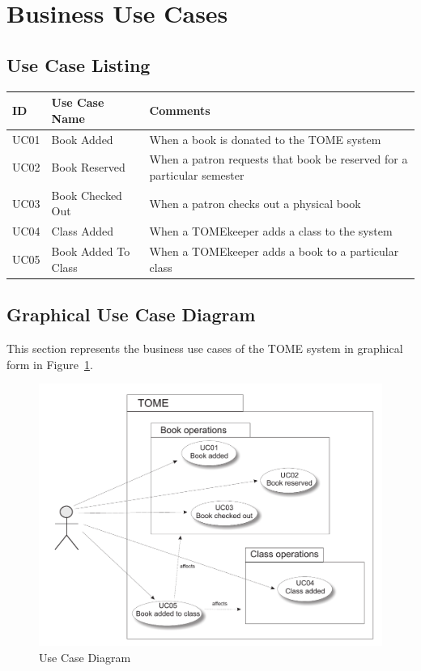 \documentclass[12pt,titlepage]{article}
\begin{document}
\section{Business Use Cases}
\subsection{Use Case Listing}
\begin{longtable}{|p{}|p{}|p{}|}
	\hline
	\textbf{ID} & \textbf{Use Case Name} & \textbf{Comments} \\
	\hline
	UC01 & Book Added & When a book is donated to the TOME system \\
	\hline
	UC02 & Book Reserved & When a patron requests that book be reserved for a particular semester \\
	\hline
	UC03 & Book Checked Out & When a patron checks out a physical book \\
	\hline
	UC04 & Class Added & When a TOMEkeeper adds a class to the system \\
	\hline
	UC05 & Book Added To Class & When a TOMEkeeper adds a book to a particular class \\
	\hline
\end{longtable}
\subsection{Graphical Use Case Diagram}
This section represents the business use cases of the TOME system in graphical form in Figure~\ref{usecase}.
\begin{figure}[h]
	\includegraphics[width=\textwidth]{GraphicalUseCaseDiagram}
	\caption{Use Case Diagram}
	\label{usecase}
\end{figure}
\end{document}
